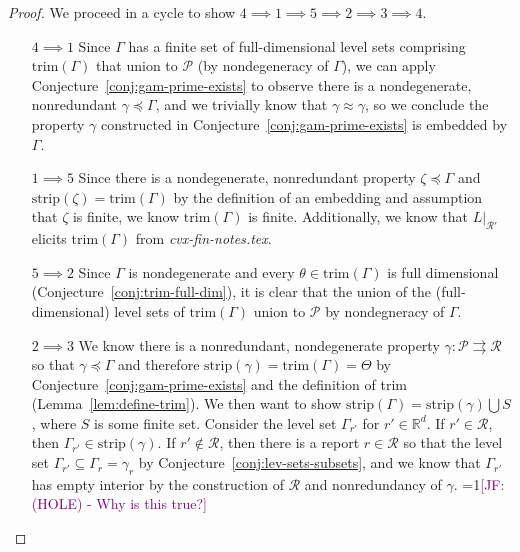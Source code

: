 \documentclass[12pt]{article}
\newcommand{\Comments}{1}
\newcommand{\mynote}[2]{\ifnum\Comments=1\textcolor{#1}{#2}\fi}
\newcommand{\jessie}[1]{\mynote{purple}{[JF: #1]}}
\newcommand{\reals}{\mathbb{R}}
\renewcommand{\P}{\mathcal{P}}
\newcommand{\R}{\mathcal{R}}
\newcommand{\toto}{\rightrightarrows}
\newcommand{\trim}{\mathrm{trim}}
\newcommand{\strip}{\mathrm{strip}}
\begin{document}
\begin{proof}
We proceed in a cycle to show $4 \implies 1 \implies 5 \implies 2 \implies 3 \implies 4$.

\begin{enumerate}


\item[$4 \implies 1$] 
Since $\Gamma$ has a finite set of full-dimensional level sets comprising $\trim(\Gamma)$ that union to $\P$ (by nondegeneracy of $\Gamma$), we can apply Conjecture~\ref{conj:gam-prime-exists} to observe there is a nondegenerate, nonredundant $\gamma \preceq \Gamma$, and we trivially know that $\gamma \approx \gamma$, so we conclude the property $\gamma$ constructed in Conjecture~\ref{conj:gam-prime-exists} is embedded by $\Gamma$.



\item [$1 \implies 5$]
Since there is a nondegenerate, nonredundant property $\zeta \preceq \Gamma$ and $\strip(\zeta) = \trim(\Gamma)$ by the definition of an embedding and assumption that $\zeta$ is finite, we know $\trim(\Gamma)$ is finite.
Additionally, we know that $L|_{\R'}$ elicits $\trim(\Gamma)$ from \emph{cvx-fin-notes.tex}.

\item [$5 \implies 2$]
Since $\Gamma$ is nondegenerate and every $\theta \in \trim(\Gamma)$ is full dimensional (Conjecture~\ref{conj:trim-full-dim}), it is clear that the union of the (full-dimensional) level sets of $\trim(\Gamma)$ union to $\P$ by nondegneracy of $\Gamma$.


\item [$2 \implies 3$]
	We know there is a nonredundant, nondegenerate property $\gamma : \P \toto \R$ so that $\gamma \preceq \Gamma$ and therefore $\strip(\gamma) = \trim(\Gamma) = \Theta$ by Conjecture~\ref{conj:gam-prime-exists} and the definition of trim (Lemma~\ref{lem:define-trim}).
	We then want to show $\strip(\Gamma) = \strip(\gamma) \bigcup S$, where $S$ is some finite set.
	Consider the level set $\Gamma_{r'}$ for $r' \in \reals^d$.
	If $r' \in \R$, then $\Gamma_{r'} \in \strip(\gamma)$.
	If $r' \not \in \R$, then there is a report $r \in \R$ so that the level set $\Gamma_{r'} \subseteq \Gamma_r = \gamma_r$ by Conjecture~\ref{conj:lev-sets-subsets}, and we know that $\Gamma_{r'}$ has empty interior by the construction of $\R$ and nonredundancy of $\gamma$.
	\jessie{(HOLE) - Why is this true?}


\end{enumerate}
\end{proof}
\end{document}
